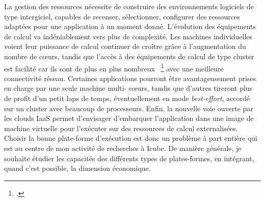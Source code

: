 \documentclass[11pt]{article}
\begin{document}
La gestion des  ressources nécessite de construire  des environnements logiciels
de  type  intergiciel,  capables   de  recenser,  sélectionner,  configurer  des
ressources adaptées  pour une application à  un moment donné. L'évolution  des 
équipements  de calcul va indéniablement vers plus  de complexité.  Les machines
individuelles  voient leur  puissance de  calcul  continuer de  croître grâce  à
l'augmentation du nombre  de c{\oe}urs, tandis que l'accès à  des équipements de
calcul de  type cluster  est facilité car  ils sont de  plus en  plus nombreux~%
\footcite{Wu09} avec  une meilleure connectivité réseau.  Certaines applications
pourront être  avantageusement prises  en charge par  une seule  machine multi-%
c{\oe}urs, tandis que d'autres tireront plus de profit d'un petit laps de temps,
éventuellement  en  mode  \textit{best-effort},  accordé  sur  un  cluster  avec
beaucoup de  processeurs. Enfin, la  nouvelle voie  ouverte par les  clouds IaaS
permet d'envisager d'embarquer l'application dans une image de machine virtuelle
pour l'exécuter sur des ressources de calcul externalisées. \\

Choisir la bonne plate-forme d'exécution est donc un problème à part entière qui
est au  centre de mon  activité de recherches à  Icube. De manière  générale, je
souhaite  étudier  les  capacités  des différents  types  de  plates-formes,  en
intégrant, quand c'est possible, la dimension économique.
\end{document}
